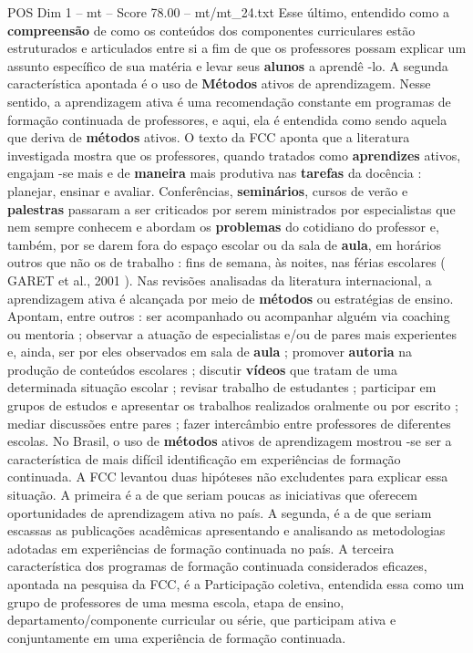 \begin{textsample}{POS Dim 1 – mt – Score 78.00 – mt/mt\_24.txt}
Esse último, entendido como a \textbf{compreensão} de como os conteúdos dos componentes curriculares estão estruturados e articulados entre si a fim de que os professores possam explicar um assunto específico de sua matéria e levar seus \textbf{alunos} a aprendê -lo.
A segunda característica apontada é o uso de \textbf{Métodos} ativos de aprendizagem.
Nesse sentido, a aprendizagem ativa é uma recomendação constante em programas de formação continuada de professores, e aqui, ela é entendida como sendo aquela que deriva de \textbf{métodos} ativos.
O texto da FCC aponta que a literatura investigada mostra que os professores, quando tratados como \textbf{aprendizes} ativos, engajam -se mais e de \textbf{maneira} mais produtiva nas \textbf{tarefas} da docência : planejar, ensinar e avaliar.
Conferências, \textbf{seminários}, cursos de verão e \textbf{palestras} passaram a ser criticados por serem ministrados por especialistas que nem sempre conhecem e abordam os \textbf{problemas} do cotidiano do professor e, também, por se darem fora do espaço escolar ou da sala de \textbf{aula}, em horários outros que não os de trabalho : fins de semana, às noites, nas férias escolares ( GARET et al., 2001 ).
Nas revisões analisadas da literatura internacional, a aprendizagem ativa é alcançada por meio de \textbf{métodos} ou estratégias de ensino.
Apontam, entre outros : ser acompanhado ou acompanhar alguém via coaching ou mentoria ; observar a atuação de especialistas e/ou de pares mais experientes e, ainda, ser por eles observados em sala de \textbf{aula} ; promover \textbf{autoria} na produção de conteúdos escolares ; discutir \textbf{vídeos} que tratam de uma determinada situação escolar ; revisar trabalho de estudantes ; participar em grupos de estudos e apresentar os trabalhos realizados oralmente ou por escrito ; mediar discussões entre pares ; fazer intercâmbio entre professores de diferentes escolas.
No Brasil, o uso de \textbf{métodos} ativos de aprendizagem mostrou -se ser a característica de mais difícil identificação em experiências de formação continuada.
A FCC levantou duas hipóteses não excludentes para explicar essa situação.
A primeira é a de que seriam poucas as iniciativas que oferecem oportunidades de aprendizagem ativa no país.
A segunda, é a de que seriam escassas as publicações acadêmicas apresentando e analisando as metodologias adotadas em experiências de formação continuada no país.
A terceira característica dos programas de formação continuada considerados eficazes, apontada na pesquisa da FCC, é a Participação coletiva, entendida essa como um grupo de professores de uma mesma escola, etapa de ensino, departamento/componente curricular ou série, que participam ativa e conjuntamente em uma experiência de formação continuada.

\end{textsample}
